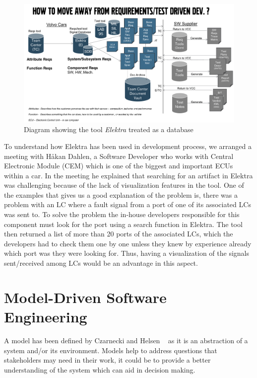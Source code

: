 \begin{figure}[H]
\centering
\captionsetup{justification=centering}
\vspace{0cm}%
\includegraphics[width=0.95\linewidth]{figure/literatures/niesel_elektra.pdf}
\caption{Diagram showing the tool \textit{Elektra} treated as a database \cite{Niesel}}
\label{fig:niesel-elektra}
\end{figure}

To understand how Elektra has been used in development process, we arranged a meeting with Håkan Dahlen, a Software Developer who works with Central Electronic Module (CEM) which is one of the biggest and important ECUs within a car. In the meeting he  explained that searching for an artifact in Elektra was challenging because of the lack of visualization features in the tool. One of the examples that gives us a good explanation of the problem is, there was a problem with an LC where a fault signal from a port of one of its associated LCs was sent to. To solve the problem the in-house developers responsible for this component must look for the port using a search function in Elektra. The tool then returned a list of more than 20 ports of the associated LCs, which the developers had to check them one by one unless they knew by experience already which port was they were looking for. Thus, having a visualization of the signals sent/received among LCs would be an advantage in this aspect. \\

\section{Model-Driven Software Engineering}
A model has been defined by Czarnecki and Helsen ~\cite{Czarnecki} as it is an abstraction of a system and/or its environment. Models help to address questions that stakeholders may need in their work, it could be to provide a better understanding of the system which can aid in decision making.\\


